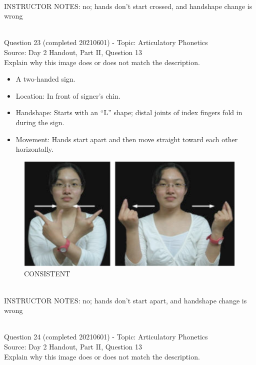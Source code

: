 \documentclass[12pt]{article}
\begin{document}
~\\
INSTRUCTOR NOTES: no; hands don't start crossed, and handshape change is wrong


~\\

{\large Question 23} (completed 20210601) - Topic: Articulatory Phonetics\\
Source: Day 2 Handout, Part II, Question 13\\

Explain why this image does or does not match the description.\\

\begin{itemize} \item A two-handed sign. \item Location: In front of signer’s chin. \item Handshape: Starts with an “L” shape; distal joints of index fingers fold in during the sign. \item Movement: Hands start apart and then move straight toward each other horizontally. \end{itemize}

\begin{figure}[H]
\includegraphics{../images/taiwansign_consistent.png}
\caption{CONSISTENT}
\end{figure}

~\\
INSTRUCTOR NOTES: no; hands don't start apart, and handshape change is wrong


~\\

{\large Question 24} (completed 20210601) - Topic: Articulatory Phonetics\\
Source: Day 2 Handout, Part II, Question 13\\

Explain why this image does or does not match the description.\\
\end{document}

